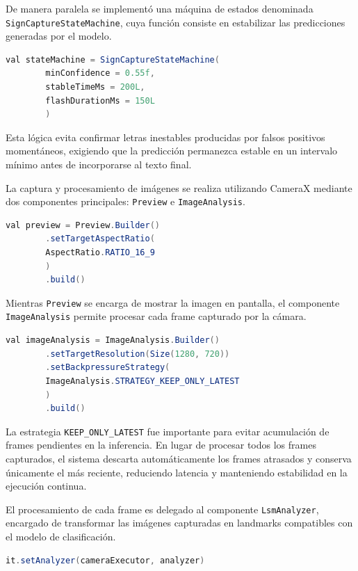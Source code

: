 	De manera paralela se implementó una máquina de estados denominada
	\texttt{SignCaptureStateMachine}, cuya función consiste en estabilizar
	las predicciones generadas por el modelo.
	
	\begin{lstlisting}[language=Java]
		val stateMachine = SignCaptureStateMachine(
		minConfidence = 0.55f,
		stableTimeMs = 200L,
		flashDurationMs = 150L
		)
	\end{lstlisting}
	
	Esta lógica evita confirmar letras inestables producidas por falsos
	positivos momentáneos, exigiendo que la predicción permanezca estable
	en un intervalo mínimo antes de incorporarse al texto final.
	
	La captura y procesamiento de imágenes se realiza utilizando CameraX
	mediante dos componentes principales: \texttt{Preview} e
	\texttt{ImageAnalysis}.
	
	\begin{lstlisting}[language=Java]
		val preview = Preview.Builder()
		.setTargetAspectRatio(
		AspectRatio.RATIO_16_9
		)
		.build()
	\end{lstlisting}
	
	Mientras \texttt{Preview} se encarga de mostrar la imagen en pantalla,
	el componente \texttt{ImageAnalysis} permite procesar cada frame
	capturado por la cámara.
	
	\begin{lstlisting}[language=Java]
		val imageAnalysis = ImageAnalysis.Builder()
		.setTargetResolution(Size(1280, 720))
		.setBackpressureStrategy(
		ImageAnalysis.STRATEGY_KEEP_ONLY_LATEST
		)
		.build()
	\end{lstlisting}
	
	La estrategia \texttt{KEEP\_ONLY\_LATEST} fue importante para evitar
	acumulación de frames pendientes en la inferencia. En lugar de
	procesar todos los frames capturados, el sistema descarta automáticamente
	los frames atrasados y conserva únicamente el más reciente, reduciendo
	latencia y manteniendo estabilidad en la ejecución continua.
	
	El procesamiento de cada frame es delegado al componente
	\texttt{LsmAnalyzer}, encargado de transformar las imágenes capturadas
	en landmarks compatibles con el modelo de clasificación.
	
	\begin{lstlisting}[language=Java]
		it.setAnalyzer(cameraExecutor, analyzer)
	\end{lstlisting}
	
